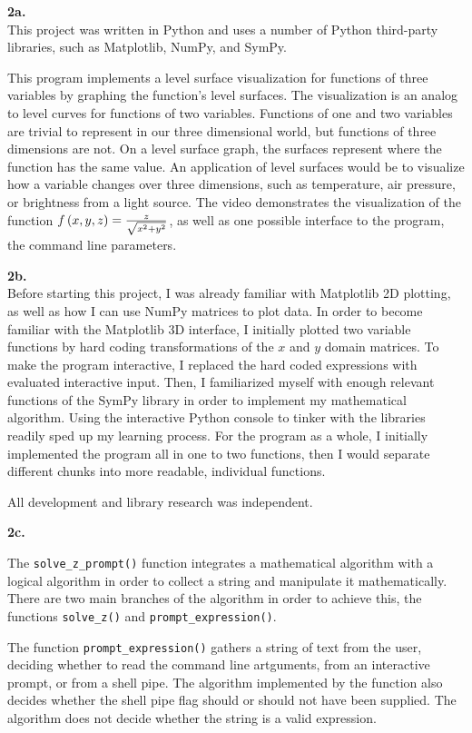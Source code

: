 \documentclass[11pt]{article}
\begin{document}
\selectfont
\textbf{2a.}\\
This project was written in Python and uses a number of Python third-party libraries, such as Matplotlib, NumPy, and
SymPy.\double

This program implements a level surface visualization for functions of three variables by graphing the function's level
surfaces. The visualization is an analog to level curves for functions of two variables. Functions of one and two variables
are trivial to represent in our three dimensional world, but functions of three dimensions are not. On a level surface graph,
the surfaces represent where the function has the same value. An application of level surfaces would be to visualize how a
variable changes over three dimensions, such as temperature, air pressure, or brightness from a light source.\double
The video demonstrates the visualization of the function $f\left({x,y,z}\right)=\frac{z}{\sqrt{x^2+y^2}}$, as well as one possible interface
to the program, the command line parameters.\double

\textbf{2b.}\\
Before starting this project, I was already familiar with Matplotlib 2D plotting, as well as how I can use NumPy matrices to
plot data. In order to become familiar with the Matplotlib 3D interface, I initially plotted two variable functions by hard
coding transformations of the $x$ and $y$ domain matrices. To make the program interactive, I replaced the hard coded
expressions with evaluated interactive input. Then, I familiarized myself with enough relevant functions of the SymPy library
in order to implement my mathematical algorithm. Using the interactive Python console to tinker with the libraries readily
sped up my learning process. For the program as a whole, I initially implemented the program all in one to two functions,
then I would separate different chunks into more readable, individual functions.\double

All development and library research was independent.\double

\textbf{2c.}


The \verb|solve_z_prompt()| function integrates a mathematical algorithm with a logical algorithm in order to collect a string
and manipulate it mathematically. There are two main branches of the algorithm in order to achieve this, the functions
\verb|solve_z()| and \verb|prompt_expression()|.\double

The function \verb|prompt_expression()| gathers a string of text from the user, deciding whether to read the command line artguments,
from an interactive prompt, or from a shell pipe. The algorithm implemented by the function also decides whether the shell pipe
flag should or should not have been supplied. The algorithm does not decide whether the string is a valid expression.\double
\end{document}
